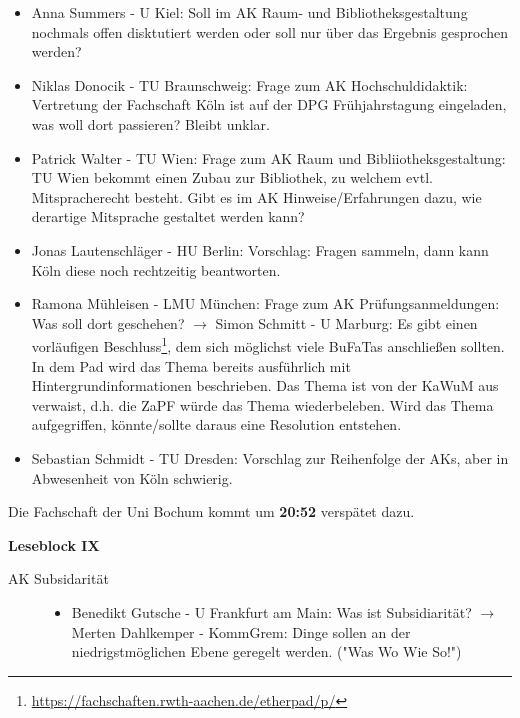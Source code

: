     \begin{itemize}
      \item Anna Summers - U Kiel:  Soll im AK Raum- und Bibliotheksgestaltung nochmals offen disktutiert werden oder soll nur über das Ergebnis gesprochen werden?
      \item Niklas Donocik - TU Braunschweig:  Frage zum AK Hochschuldidaktik: Vertretung der Fachschaft Köln ist auf der DPG Frühjahrstagung eingeladen, was woll dort passieren? Bleibt unklar.
      \item Patrick Walter - TU Wien:  Frage zum AK Raum und Bibliiotheksgestaltung: TU Wien bekommt einen Zubau zur Bibliothek, zu welchem evtl. Mitspracherecht besteht. Gibt es im AK Hinweise/Erfahrungen dazu, wie derartige Mitsprache gestaltet werden kann?
      \item Jonas Lautenschläger - HU Berlin:  Vorschlag: Fragen sammeln, dann kann Köln diese noch rechtzeitig beantworten.
      \item Ramona Mühleisen - LMU München:  Frage zum AK Prüfungsanmeldungen: Was soll dort geschehen? $\rightarrow$ Simon Schmitt - U Marburg:  Es gibt einen vorläufigen Beschluss\footnote{\url{https://fachschaften.rwth-aachen.de/etherpad/p/}}, dem sich möglichst viele BuFaTas anschließen sollten.
        In dem Pad wird das Thema bereits ausführlich mit Hintergrundinformationen beschrieben. Das Thema ist von der KaWuM aus verwaist, d.h. die ZaPF würde das Thema wiederbeleben. Wird das Thema aufgegriffen, könnte/sollte daraus eine Resolution entstehen.
      \item Sebastian Schmidt - TU Dresden:  Vorschlag zur Reihenfolge der AKs, aber in Abwesenheit von Köln schwierig.
    \end{itemize}

    \begin{info}{}
      Die Fachschaft der Uni Bochum kommt um \textbf{20:52} verspätet dazu.
    \end{info}

    \textbf{Leseblock IX} \\

    \begin{description}
      \item[AK Subsidarität]
      \begin{itemize}
        \item Benedikt Gutsche - U Frankfurt am Main:  Was ist Subsidiarität? $\rightarrow$ Merten Dahlkemper - KommGrem:  Dinge sollen an der niedrigstmöglichen Ebene geregelt werden. ("Was Wo Wie So!")
      \end{itemize}
    \end{description}

